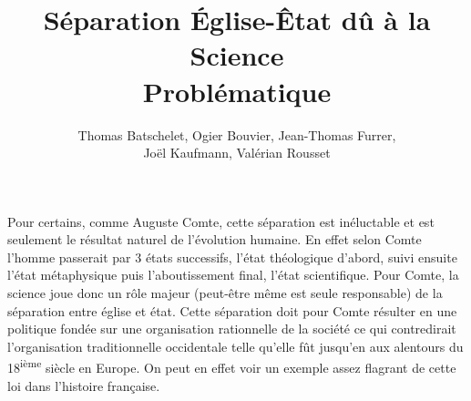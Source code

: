 \documentclass{article}
\title{Séparation Église-Êtat dû à la Science \\
  \large{Problématique}}
\author{Thomas Batschelet, Ogier Bouvier, Jean-Thomas Furrer, \\ Joël Kaufmann, Valérian Rousset}
\begin{document}
\maketitle

Pour certains, comme Auguste Comte, cette séparation est inéluctable
et est seulement le résultat naturel de l'évolution humaine. En effet
selon Comte l'homme passerait par 3 états successifs, l'état
théologique d'abord, suivi ensuite l'état métaphysique puis
l'aboutissement final, l'état scientifique. Pour Comte, la science
joue donc un rôle majeur (peut-être même est seule responsable) de la
séparation entre église et état. Cette séparation doit pour Comte
résulter en une politique fondée sur une organisation rationnelle de
la société ce qui contredirait l'organisation traditionnelle
occidentale telle qu'elle fût jusqu'en aux alentours du
18\textsuperscript{ième} siècle en Europe. On peut en effet voir un
exemple assez flagrant de cette loi dans l'histoire française.
\end{document}
